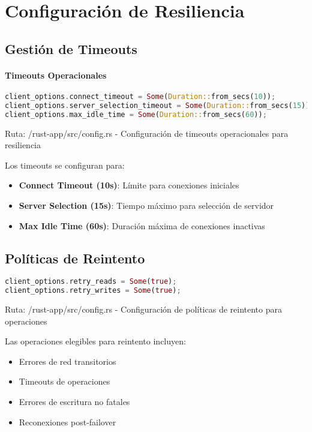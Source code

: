 \documentclass[12pt,letterpaper]{article}
\begin{document}
\section{Configuración de Resiliencia}
\subsection{Gestión de Timeouts}
\paragraph{Timeouts Operacionales}
\begin{lstlisting}[language=rust]
client_options.connect_timeout = Some(Duration::from_secs(10));
client_options.server_selection_timeout = Some(Duration::from_secs(15));
client_options.max_idle_time = Some(Duration::from_secs(60));
\end{lstlisting}
\small{Ruta: /rust-app/src/config.rs - Configuración de timeouts operacionales para resiliencia}

Los timeouts se configuran para:
\begin{itemize}
    \item \textbf{Connect Timeout (10s)}: Límite para conexiones iniciales
    \item \textbf{Server Selection (15s)}: Tiempo máximo para selección de servidor
    \item \textbf{Max Idle Time (60s)}: Duración máxima de conexiones inactivas
\end{itemize}

\subsection{Políticas de Reintento}
\begin{lstlisting}[language=rust]
client_options.retry_reads = Some(true);
client_options.retry_writes = Some(true);
\end{lstlisting}
\small{Ruta: /rust-app/src/config.rs - Configuración de políticas de reintento para operaciones}

Las operaciones elegibles para reintento incluyen:
\begin{itemize}
    \item Errores de red transitorios
    \item Timeouts de operaciones
    \item Errores de escritura no fatales
    \item Reconexiones post-failover
\end{itemize}
\end{document}
